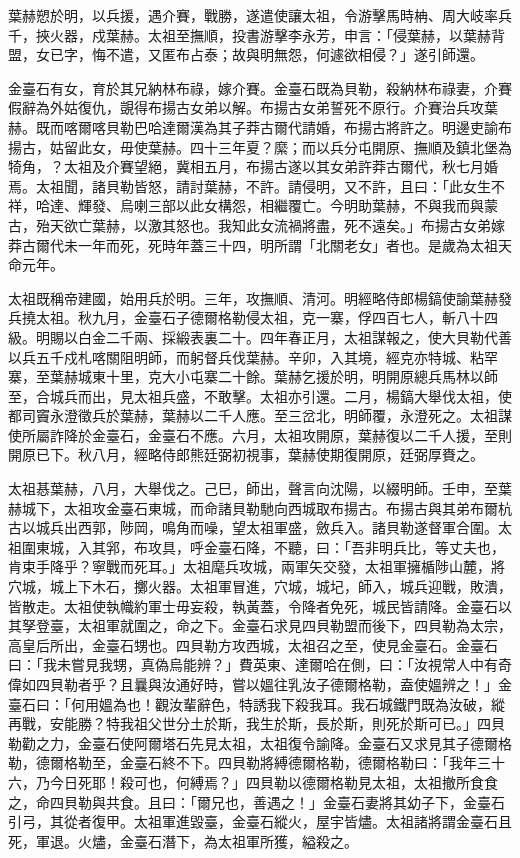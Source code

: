 \begin{pinyinscope}
葉赫愬於明，以兵援，遇介賽，戰勝，遂遣使讓太祖，令游擊馬時柟、周大岐率兵千，挾火器，戍葉赫。太祖至撫順，投書游擊李永芳，申言：「侵葉赫，以葉赫背盟，女已字，悔不遣，又匿布占泰；故與明無怨，何遽欲相侵？」遂引師還。

金臺石有女，育於其兄納林布祿，嫁介賽。金臺石既為貝勒，殺納林布祿妻，介賽假辭為外姑復仇，覬得布揚古女弟以解。布揚古女弟誓死不原行。介賽治兵攻葉赫。既而喀爾喀貝勒巴哈達爾漢為其子莽古爾代請婚，布揚古將許之。明邊吏諭布揚古，姑留此女，毋使葉赫。四十三年夏？縻；而以兵分屯開原、撫順及鎮北堡為犄角，？太祖及介賽望絕，冀相五月，布揚古遂以其女弟許莽古爾代，秋七月婚焉。太祖聞，諸貝勒皆怒，請討葉赫，不許。請侵明，又不許，且曰：「此女生不祥，哈達、輝發、烏喇三部以此女構怨，相繼覆亡。今明助葉赫，不與我而與蒙古，殆天欲亡葉赫，以激其怒也。我知此女流禍將盡，死不遠矣。」布揚古女弟嫁莽古爾代未一年而死，死時年蓋三十四，明所謂「北關老女」者也。是歲為太祖天命元年。

太祖既稱帝建國，始用兵於明。三年，攻撫順、清河。明經略侍郎楊鎬使諭葉赫發兵撓太祖。秋九月，金臺石子德爾格勒侵太祖，克一寨，俘四百七人，斬八十四級。明賜以白金二千兩、採緞表裏二十。四年春正月，太祖謀報之，使大貝勒代善以兵五千戍札喀關阻明師，而躬督兵伐葉赫。辛卯，入其境，經克亦特城、粘罕寨，至葉赫城東十里，克大小屯寨二十餘。葉赫乞援於明，明開原總兵馬林以師至，合城兵而出，見太祖兵盛，不敢擊。太祖亦引還。二月，楊鎬大舉伐太祖，使都司竇永澄徵兵於葉赫，葉赫以二千人應。至三岔北，明師覆，永澄死之。太祖謀使所屬詐降於金臺石，金臺石不應。六月，太祖攻開原，葉赫復以二千人援，至則開原已下。秋八月，經略侍郎熊廷弼初視事，葉赫使期復開原，廷弼厚賚之。

太祖惎葉赫，八月，大舉伐之。己巳，師出，聲言向沈陽，以綴明師。壬申，至葉赫城下，太祖攻金臺石東城，而命諸貝勒馳向西城取布揚古。布揚古與其弟布爾杭古以城兵出西郭，陟岡，鳴角而噪，望太祖軍盛，斂兵入。諸貝勒遂督軍合圍。太祖圍東城，入其郛，布攻具，呼金臺石降，不聽，曰：「吾非明兵比，等丈夫也，肯束手降乎？寧戰而死耳。」太祖麾兵攻城，兩軍矢交發，太祖軍擁楯陟山麓，將穴城，城上下木石，擲火器。太祖軍冒進，穴城，城圮，師入，城兵迎戰，敗潰，皆散走。太祖使執幟約軍士毋妄殺，執黃蓋，令降者免死，城民皆請降。金臺石以其孥登臺，太祖軍就圍之，命之下。金臺石求見四貝勒盟而後下，四貝勒為太宗，高皇后所出，金臺石甥也。四貝勒方攻西城，太祖召之至，使見金臺石。金臺石曰：「我未嘗見我甥，真偽烏能辨？」費英東、達爾哈在側，曰：「汝視常人中有奇偉如四貝勒者乎？且曩與汝通好時，嘗以媼往乳汝子德爾格勒，盍使媼辨之！」金臺石曰：「何用媼為也！觀汝輩辭色，特誘我下殺我耳。我石城鐵門既為汝破，縱再戰，安能勝？特我祖父世分土於斯，我生於斯，長於斯，則死於斯可已。」四貝勒勸之力，金臺石使阿爾塔石先見太祖，太祖復令諭降。金臺石又求見其子德爾格勒，德爾格勒至，金臺石終不下。四貝勒將縛德爾格勒，德爾格勒曰：「我年三十六，乃今日死耶！殺可也，何縛焉？」四貝勒以德爾格勒見太祖，太祖撤所食食之，命四貝勒與共食。且曰：「爾兄也，善遇之！」金臺石妻將其幼子下，金臺石引弓，其從者復甲。太祖軍進毀臺，金臺石縱火，屋宇皆燼。太祖諸將謂金臺石且死，軍退。火燼，金臺石潛下，為太祖軍所獲，縊殺之。


\end{pinyinscope}
